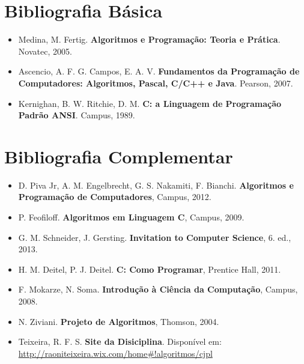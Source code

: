 \documentclass[12pt]{article}
\begin{document}
\section{Bibliografia B\'asica}
\begin{itemize}
\item Medina, M. Fertig. \textbf{Algoritmos e Programa\c{c}\~ao: Teoria e Pr\'atica}. Novatec, 2005.
\item Ascencio, A. F. G. Campos, E. A. V. \textbf{Fundamentos da Programa\c{c}\~ao de Computadores: Algoritmos, Pascal, C/C++ e Java}. Pearson, 2007.
\item Kernighan, B. W. Ritchie, D. M. \textbf{C: a Linguagem de Programa\c{c}\~ao Padr\~ao ANSI}. Campus, 1989.
\end{itemize}

\section{Bibliografia Complementar}
\begin{itemize}
\item D. Piva Jr, A. M. Engelbrecht, G. S. Nakamiti, F. Bianchi. \textbf{Algoritmos e Programa\c{c}\~ao de Computadores}, Campus, 2012.
\item P. Feofiloff. \textbf{Algoritmos em Linguagem C}, Campus, 2009.
\item G. M. Schneider, J. Gersting. \textbf{Invitation to Computer Science}, 6. ed., 2013.
\item H. M. Deitel, P. J. Deitel. \textbf{C: Como Programar}, Prentice Hall, 2011.
\item F. Mokarze, N. Soma. \textbf{Introdu\c{c}\~ao \`a Ci\^encia da Computa\c{c}\~ao}, Campus, 2008.
\item N. Ziviani. \textbf{Projeto de Algoritmos}, Thomson, 2004.
\item Teixeira, R. F. S. \textbf{Site da Disiciplina}. Disponível em: 
 \url{http://raoniteixeira.wix.com/home\#!algoritmos/cjpl}
\end{itemize}
\end{document}

